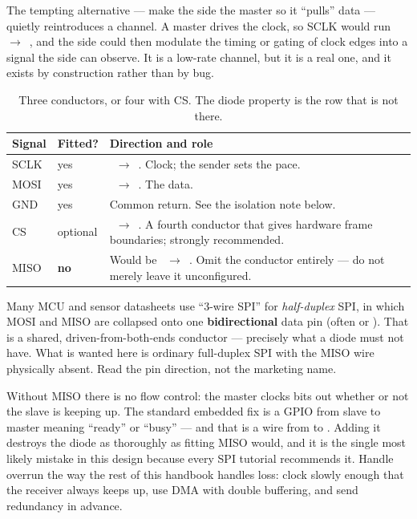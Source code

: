 \documentclass[11pt,a4paper]{article}
\begin{document}
The tempting alternative --- make the \dstside{} side the master so it
``pulls'' data --- quietly reintroduces a channel. A master drives the clock,
so SCLK would run \dstside{}~$\rightarrow$~\srcside{}, and the \dstside{}
side could then modulate the timing or gating of clock edges into a signal the
\srcside{} side can observe. It is a low-rate channel, but it is a real one,
and it exists by construction rather than by bug.

\begin{table}[h]
\centering\small
\begin{tabularx}{\textwidth}{@{}llX@{}}
\toprule
\textbf{Signal} & \textbf{Fitted?} & \textbf{Direction and role} \\
\midrule
SCLK & yes & \srcside{}~$\rightarrow$~\dstside{}. Clock; the sender sets the
             pace. \\
MOSI & yes & \srcside{}~$\rightarrow$~\dstside{}. The data. \\
GND  & yes & Common return. See the isolation note below. \\
CS   & optional & \srcside{}~$\rightarrow$~\dstside{}. A fourth conductor
             that gives hardware frame boundaries; strongly recommended. \\
MISO & \textbf{no} & Would be \dstside{}~$\rightarrow$~\srcside{}. Omit the
             conductor entirely --- do not merely leave it unconfigured. \\
\bottomrule
\end{tabularx}
\caption{Three conductors, or four with CS. The diode property is the row
         that is not there.}
\end{table}

\begin{warnbox}
Many MCU and sensor datasheets use ``3-wire SPI'' for \emph{half-duplex} SPI,
in which MOSI and MISO are collapsed onto one \textbf{bidirectional} data pin
(often  or ). That is a shared, driven-from-both-ends
conductor --- precisely what a diode must not have. What is wanted here is
ordinary full-duplex SPI with the MISO wire physically absent. Read the pin
direction, not the marketing name.
\end{warnbox}

\begin{warnbox}
Without MISO there is no flow control: the master clocks bits out whether or
not the slave is keeping up. The standard embedded fix is a GPIO from slave to
master meaning ``ready'' or ``busy'' --- and that is a wire from \dstside{} to
\srcside{}. Adding it destroys the diode as thoroughly as fitting MISO would,
and it is the single most likely mistake in this design because every SPI
tutorial recommends it. Handle overrun the way the rest of this handbook
handles loss: clock slowly enough that the receiver always keeps up, use DMA
with double buffering, and send redundancy in advance.
\end{warnbox}
\end{document}

